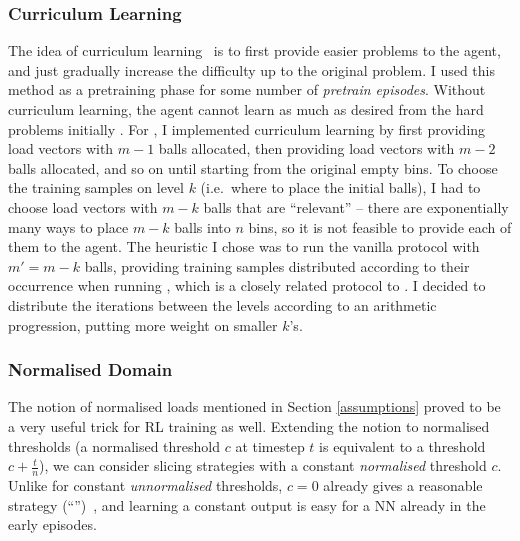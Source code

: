 \subsubsection{Curriculum Learning}


The idea of curriculum learning~\cite{bengio2009curriculumoriginal} is to first provide easier problems to the agent, and just gradually increase the difficulty up to the original problem. I used this method as a pretraining phase for some number of \textit{pretrain episodes}. Without curriculum learning, the agent cannot learn as much as desired from the hard problems initially . For \TwoThinning, I implemented curriculum learning by first providing load vectors with $m-1$ balls allocated, then providing load vectors with $m-2$ balls allocated, and so on until starting from the original empty bins. To choose the training samples on level $k$ (i.e.\ where to place the initial balls), I had to choose load vectors with $m-k$ balls that are ``relevant'' -- there are exponentially many ways to place $m-k$ balls into $n$ bins, so it is not feasible to provide each of them to the agent. The heuristic I chose was to run the vanilla \OneChoice protocol with $m'=m-k$ balls, providing training samples distributed according to their occurrence when running \OneChoice, which is a closely related protocol to \TwoThinning. I decided to distribute the iterations between the levels according to an arithmetic progression, putting more weight on smaller $k$'s.



\subsubsection{Normalised Domain} \label{normalised-domain}

The notion of normalised loads mentioned in Section \ref{assumptions} proved to be a very useful trick for RL training as well. Extending the notion to normalised thresholds (a normalised threshold $c$ at timestep $t$ is equivalent to a threshold $c+\frac{t}{n}$), we can consider slicing strategies with a constant \textit{normalised} threshold $c$. Unlike for constant \textit{unnormalised} thresholds, $c=0$ already gives a reasonable strategy (``\MeanThinning'')~\cite{los2022cachingpackingthinningtwinning}, and learning a constant output is easy for a NN already in the early episodes.


